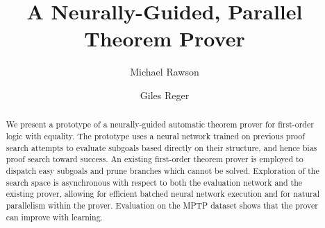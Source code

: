 \documentclass{llncs}
\begin{document}
\title{A Neurally-Guided, Parallel Theorem Prover}
\author{
	Michael Rawson \and
	Giles Reger
}
\maketitle

\begin{abstract}
	We present a prototype of a neurally-guided automatic theorem prover for first-order logic with equality.
	The prototype uses a neural network trained on previous proof search attempts to evaluate subgoals based directly on their structure, and hence bias proof search toward success.
	An existing first-order theorem prover is employed to dispatch easy subgoals and prune branches which cannot be solved.
	Exploration of the search space is asynchronous with respect to both the evaluation network and the existing prover, allowing for efficient batched neural network execution and for natural parallelism within the prover.
	Evaluation on the MPTP dataset shows that the prover can improve with learning.
\end{abstract}

\end{document}
